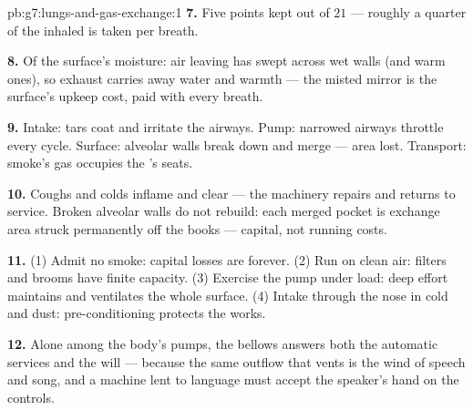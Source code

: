 \begin{solution}{pb:g7:lungs-and-gas-exchange:1}
\textbf{7.} Five points kept out of $21$ --- roughly a
quarter of the inhaled  is taken per breath.

\textbf{8.} Of the surface's moisture: air leaving has
swept across wet walls (and warm ones), so exhaust
carries away water and warmth --- the misted mirror is
the surface's upkeep cost, paid with every breath.

\textbf{9.} Intake: tars coat and irritate the airways.
Pump: narrowed airways throttle every cycle. Surface:
alveolar walls break down and merge --- area lost.
Transport: smoke's gas occupies the 's 
seats.

\textbf{10.} Coughs and colds inflame and clear --- the
machinery repairs and returns to service. Broken alveolar
walls do not rebuild: each merged pocket is exchange area
struck permanently off the books --- capital, not
running costs.

\textbf{11.} (1) Admit no smoke: capital losses are
forever. (2) Run on clean air: filters and brooms have
finite capacity. (3) Exercise the pump under load: deep
effort maintains  and ventilates the whole
surface. (4) Intake through the nose in cold and dust:
pre-conditioning protects the works.

\textbf{12.} Alone among the body's pumps, the bellows
answers both the automatic services and the will ---
because the same outflow that vents  is
the wind of speech and song, and a machine lent to
language must accept the speaker's hand on the controls.
\end{solution}
